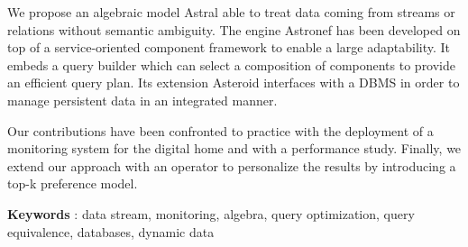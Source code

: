 We propose an algebraic model Astral able to treat data coming from streams or relations without semantic ambiguity. The engine Astronef has been developed on top of a service-oriented component framework to enable a large adaptability. It embeds a query builder which can select a composition of components to provide an efficient query plan. Its extension Asteroid interfaces with a DBMS in order to manage persistent data in an integrated manner.

Our contributions have been confronted to practice with the deployment of a monitoring system for the digital home and with a performance study. Finally, we extend our approach with an operator to personalize the results by introducing a top-k preference model.

\quad

\textbf{Keywords} : data stream, monitoring, algebra, query optimization, query equivalence, databases, dynamic data